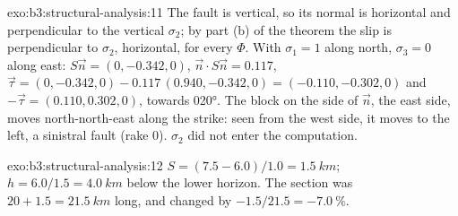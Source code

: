 \begin{solution}{exo:b3:structural-analysis:11}
The fault is vertical, so its normal is horizontal and perpendicular to the
vertical $\sigma_2$; by part (b) of the theorem the slip is perpendicular to
$\sigma_2$, horizontal, for every $\Phi$. With $\sigma_1 = 1$ along north,
$\sigma_3 = 0$ along east: $S\vec n = (0, -0.342, 0)$, $\vec n\cdot S\vec n =
0.117$, $\vec\tau = (0, -0.342, 0) - 0.117\,(0.940, -0.342, 0) = (-0.110,
-0.302, 0)$ and $-\vec\tau = (0.110, 0.302, 0)$, towards \ang{020}. The block
on the side of $\vec n$, the east side, moves north-north-east along the
strike: seen from the west side, it moves to the left, a sinistral fault (rake
0). $\sigma_2$ did not enter the computation.
\end{solution}

\begin{solution}{exo:b3:structural-analysis:12}
$S = (7.5 - 6.0)/1.0 = \qty{1.5}{km}$; $h = 6.0/1.5 = \qty{4.0}{km}$ below the
lower horizon. The section was $20 + 1.5 = \qty{21.5}{km}$ long, and changed
by $-1.5/21.5 = \qty{-7.0}{\percent}$.
\end{solution}

